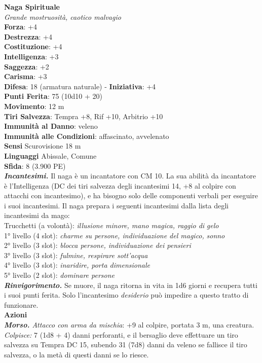 \begin{multicols}{2}
\medskip\textbf{Naga Spirituale}\\
\emph{Grande mostruosità, caotico malvagio}\\
\textbf{Forza}: +4\\
\textbf{Destrezza}: +4\\
\textbf{Costituzione}: +4\\
\textbf{Intelligenza}: +3\\
\textbf{Saggezza}: +2\\
\textbf{Carisma}: +3\\
\textbf{Difesa}: 18 (armatura naturale) - \textbf{Iniziativa}: +4\\
\textbf{Punti Ferita}: 75 (10d10 + 20)\\
\textbf{Movimento}: 12 m\\
\textbf{Tiri Salvezza}: Tempra +8, Rif +10, Arbitrio +10\\
\textbf{Immunità al Danno}: veleno\\
\textbf{Immunità alle Condizioni}: affascinato, avvelenato\\
\textbf{Sensi} Scurovisione 18 m\\
\textbf{Linguaggi} Abissale, Comune\\
\textbf{Sfida}: 8 (3.900 PE)\smallskip\\
\emph{\textbf{Incantesimi.}} Il naga è un incantatore con CM 10. La sua abilità da incantatore è l'Intelligenza (DC dei tiri salvezza degli incantesimi 14, +8 al colpire con attacchi con incantesimo), e ha bisogno solo delle componenti verbali per eseguire i suoi incantesimi. Il naga prepara i seguenti incantesimi dalla lista degli incantesimi da mago: \\
Trucchetti (a volontà): \emph{illusione minore, mano magica, raggio di} \emph{gelo}\\
1° livello (4 slot): \emph{charme su persone, individuazione del magico,} \emph{sonno}\\
2° livello (3 slot): \emph{blocca persone, individuazione dei pensieri}\\
3° livello (3 slot): \emph{fulmine, respirare sott'acqua}\\
4° livello (3 slot): \emph{inaridire, porta dimensionale}\\
5° livello (2 slot): \emph{dominare persone}\\
\emph{\textbf{Rinvigorimento.}} Se muore, il naga ritorna in vita in 1d6 giorni e recupera tutti i suoi punti ferita. Solo l'incantesimo \emph{desiderio} può impedire a questo tratto di funzionare.\\
\smallskip\textbf{Azioni}\\
\emph{\textbf{Morso.} Attacco con arma da mischia}: +9 al colpire, portata 3 m, una creatura.\\
\emph{Colpisce:} 7 (1d8 + 4) danni perforanti, e il bersaglio deve effettuare un tiro salvezza su Tempra DC  15, subendo 31 (7d8) danni da veleno se fallisce il tiro salvezza, o la metà di questi danni se lo riesce.\\


\end{multicols}

